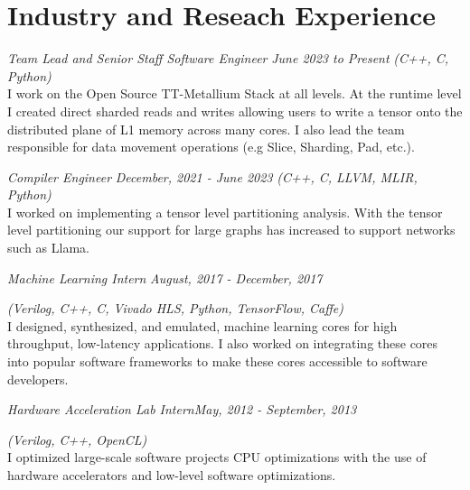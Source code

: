 \section{\sc Industry and Reseach Experience}

{\em Team Lead and Senior Staff Software Engineer }{\em June 2023 to Present}
{
     {\em (C++, C, Python) } \\
     I work on the Open Source TT-Metallium Stack at all levels. At the runtime level I created direct sharded reads and writes allowing users to write a tensor onto the distributed plane of L1 memory across many cores. I also lead the team responsible for data movement operations (e.g Slice, Sharding, Pad, etc.).
}

{\em Compiler Engineer }{\em December, 2021 - June 2023}
{
     {\em (C++, C, LLVM, MLIR, Python) } \\
     I worked on implementing a tensor level partitioning analysis. With the tensor level partitioning our support for large graphs has increased to support networks such as Llama.
}

%

{\em Machine Learning Intern }{\em August, 2017 - December, 2017}
{
     {\em (Verilog, C++, C, Vivado HLS, Python, TensorFlow, Caffe) } \\
        I designed, synthesized, and emulated,  machine learning cores for high throughput, low-latency applications. I also worked on integrating these cores into popular software frameworks to make these cores accessible to software developers. 
    
}

{\em Hardware Acceleration Lab Intern}{\em May, 2012 - September, 2013}
{
     {\em (Verilog, C++, OpenCL) } \\
        I optimized large-scale software projects CPU optimizations with the use of hardware accelerators and low-level software optimizations.
    

}
